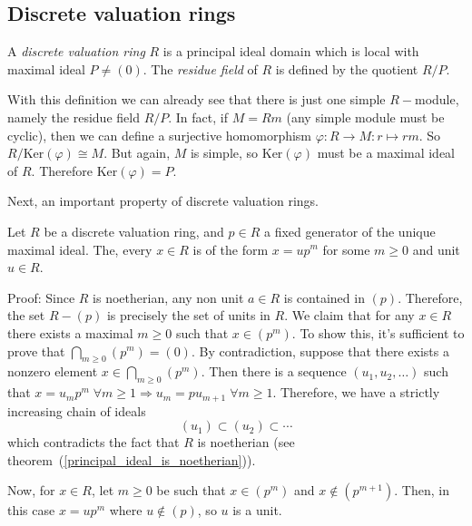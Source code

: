 \subsection{Discrete valuation rings}
\begin{dang}
    \begin{definition}
        A \textit{discrete valuation ring} $R$ is a principal ideal domain which is local with maximal ideal $P\neq(0)$. The \textit{residue field} of $R$ is defined by the quotient $R/P$.
    \end{definition}
\end{dang}
With this definition we can already see that there is just one simple $R-$module, namely the residue field $R/P$. In fact, if $M=Rm$ (any simple module must be cyclic), then we can define a surjective homomorphism $\varphi:R\rightarrow M:r\mapsto rm$. So $R/\text{Ker}(\varphi)\cong M$. But again, $M$ is simple, so $\text{Ker}(\varphi)$ must be a maximal ideal of $R$. Therefore $\text{Ker}(\varphi)=P$.\par
Next, an important property of discrete valuation rings.
\begin{dang}
    \begin{theorem}\label{Theorem: every element in a discrete valuation ring is upm}
        Let $R$ be a discrete valuation ring, and $p\in R$ a fixed generator of the unique maximal ideal. The, every $x\in R$ is of the form $x=up^m$ for some $m\geq0$ and unit $u\in R$. 
    \end{theorem}
\end{dang}
Proof: Since $R$ is noetherian, any non unit $a\in R$ is contained in $(p)$. Therefore, the set $R-(p)$ is precisely the set of units in $R$. We claim that for any $x\in R$ there exists a maximal $m\geq0$ such that $x\in (p^m)$. To show this, it's sufficient to prove that $\bigcap_{m\geq0}(p^m)=(0)$. By contradiction, suppose that there exists a nonzero element $x\in \bigcap_{m\geq0}(p^m)$. Then there is a sequence $(u_1,u_2,\dots)$ such that  $x=u_mp^m\;\forall m\geq1\Rightarrow u_m=pu_{m+1}\;\forall m\geq 1$. Therefore, we have a strictly increasing chain of ideals
\begin{equation}
    (u_1)\subset (u_2)\subset \cdots
\end{equation}
which contradicts the fact that $R$ is noetherian (see theorem~(\ref{principal_ideal_is_noetherian})).\par
Now, for $x\in R$, let $m\geq0$ be such that $x\in(p^m)$ and $x\notin(p^{m+1})$. Then, in this case $x=up^m$ where $u\notin(p)$, so $u$ is a unit.
